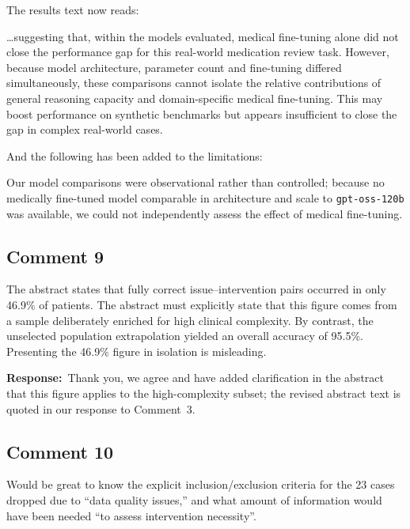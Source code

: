 \documentclass[11pt,a4paper]{article}
\newcounter{rcomment}
\newcommand{\response}{\noindent\textbf{Response:}\ }
\begin{document}
The results text now reads:

\begin{manuscriptchange}
\ldots suggesting that, within the models evaluated, medical fine-tuning alone did not close the performance gap for this real-world medication review task. However, because model architecture, parameter count and fine-tuning differed simultaneously, these comparisons cannot isolate the relative contributions of general reasoning capacity and domain-specific medical fine-tuning. This may boost performance on synthetic benchmarks but appears insufficient to close the gap in complex real-world cases.
\end{manuscriptchange}

And the following has been added to the limitations:

\begin{manuscriptchange}
Our model comparisons were observational rather than controlled; because no medically fine-tuned model comparable in architecture and scale to \texttt{gpt-oss-120b} was available, we could not independently assess the effect of medical fine-tuning.
\end{manuscriptchange}

\subsection*{Comment 9}
\begin{reviewercomment}
The abstract states that fully correct issue--intervention pairs occurred in only 46.9\% of patients. The abstract must explicitly state that this figure comes from a sample deliberately enriched for high clinical complexity. By contrast, the unselected population extrapolation yielded an overall accuracy of 95.5\%. Presenting the 46.9\% figure in isolation is misleading.
\end{reviewercomment}

\response Thank you, we agree and have added clarification in the abstract that this figure applies to the high-complexity subset; the revised abstract text is quoted in our response to Comment~3.

\subsection*{Comment 10}
\begin{reviewercomment}
Would be great to know the explicit inclusion/exclusion criteria for the 23 cases dropped due to ``data quality issues,'' and what amount of information would have been needed ``to assess intervention necessity''.
\end{reviewercomment}
\end{document}
